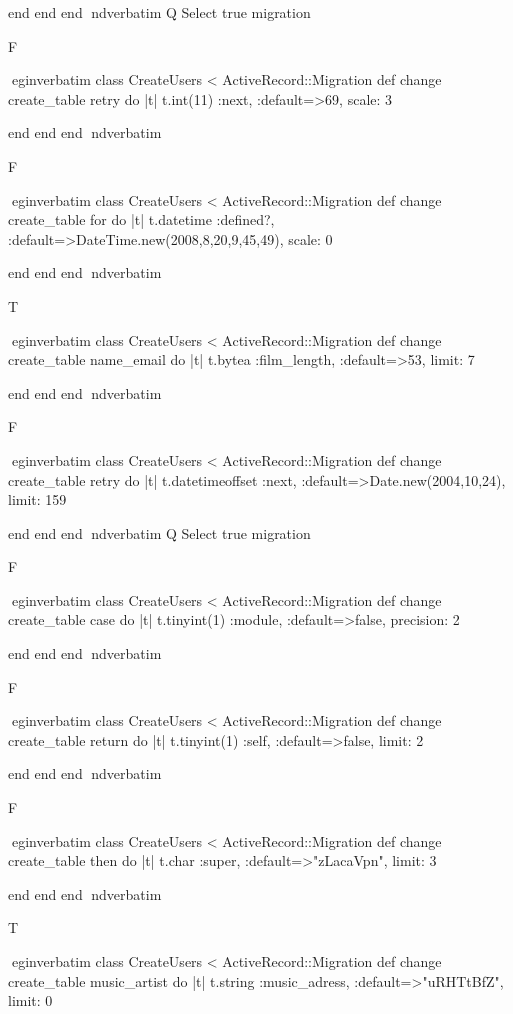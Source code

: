     end 
  end 
end
nd{verbatim}
Q
 Select true migration

F

egin{verbatim}
 class CreateUsers < ActiveRecord::Migration 
  def change 
    create_table retry do |t| 
      t.int(11) :next, :default=>69, scale: 3
    
    end 
  end 
end
nd{verbatim}

F

egin{verbatim}
 class CreateUsers < ActiveRecord::Migration 
  def change 
    create_table for do |t| 
      t.datetime :defined?, :default=>DateTime.new(2008,8,20,9,45,49), scale: 0
    
    end 
  end 
end
nd{verbatim}

T

egin{verbatim}
 class CreateUsers < ActiveRecord::Migration 
  def change 
    create_table name_email do |t| 
      t.bytea :film_length, :default=>53, limit: 7
    
    end 
  end 
end
nd{verbatim}

F

egin{verbatim}
 class CreateUsers < ActiveRecord::Migration 
  def change 
    create_table retry do |t| 
      t.datetimeoffset :next, :default=>Date.new(2004,10,24), limit: 159
    
    end 
  end 
end
nd{verbatim}
Q
 Select true migration

F

egin{verbatim}
 class CreateUsers < ActiveRecord::Migration 
  def change 
    create_table case do |t| 
      t.tinyint(1) :module, :default=>false, precision: 2
    
    end 
  end 
end
nd{verbatim}

F

egin{verbatim}
 class CreateUsers < ActiveRecord::Migration 
  def change 
    create_table return do |t| 
      t.tinyint(1) :self, :default=>false, limit: 2
    
    end 
  end 
end
nd{verbatim}

F

egin{verbatim}
 class CreateUsers < ActiveRecord::Migration 
  def change 
    create_table then do |t| 
      t.char :super, :default=>"zLacaVpn", limit: 3
    
    end 
  end 
end
nd{verbatim}

T

egin{verbatim}
 class CreateUsers < ActiveRecord::Migration 
  def change 
    create_table music_artist do |t| 
      t.string :music_adress, :default=>"uRHTtBfZ", limit: 0
    
